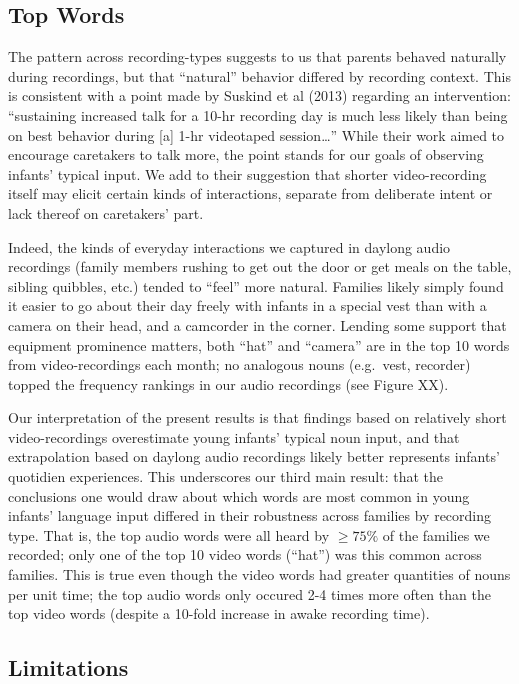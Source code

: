 \documentclass[floatsintext,man]{apa6}
\theoremstyle{definition}
\theoremstyle{definition}
\theoremstyle{definition}
\theoremstyle{remark}
\begin{document}
\subsection{Top Words}\label{top-words}

The pattern across recording-types suggests to us that parents behaved
naturally during recordings, but that \enquote{natural} behavior
differed by recording context. This is consistent with a point made by
Suskind et al (2013) regarding an intervention: \enquote{sustaining
increased talk for a 10-hr recording day is much less likely than being
on best behavior during {[}a{]} 1-hr videotaped session\ldots{}} While
their work aimed to encourage caretakers to talk more, the point stands
for our goals of observing infants' typical input. We add to their
suggestion that shorter video-recording itself may elicit certain kinds
of interactions, separate from deliberate intent or lack thereof on
caretakers' part.

Indeed, the kinds of everyday interactions we captured in daylong audio
recordings (family members rushing to get out the door or get meals on
the table, sibling quibbles, etc.) tended to \enquote{feel} more
natural. Families likely simply found it easier to go about their day
freely with infants in a special vest than with a camera on their head,
and a camcorder in the corner. Lending some support that equipment
prominence matters, both \enquote{hat} and \enquote{camera} are in the
top 10 words from video-recordings each month; no analogous nouns
(e.g.~vest, recorder) topped the frequency rankings in our audio
recordings (see Figure XX).

Our interpretation of the present results is that findings based on
relatively short video-recordings overestimate young infants' typical
noun input, and that extrapolation based on daylong audio recordings
likely better represents infants' quotidien experiences. This
underscores our third main result: that the conclusions one would draw
about which words are most common in young infants' language input
differed in their robustness across families by recording type. That is,
the top audio words were all heard by \(\geq 75\%\) of the families we
recorded; only one of the top 10 video words (\enquote{hat}) was this
common across families. This is true even though the video words had
greater quantities of nouns per unit time; the top audio words only
occured 2-4 times more often than the top video words (despite a 10-fold
increase in awake recording time).

\subsection{Limitations}\label{limitations}
\end{document}
